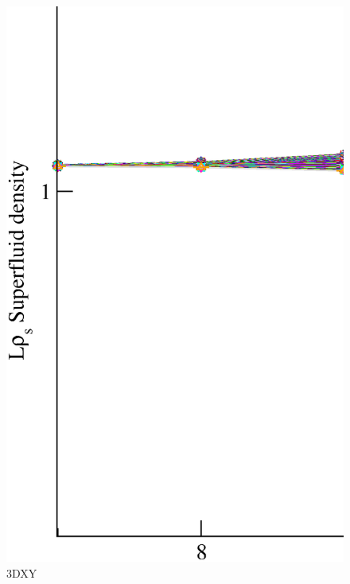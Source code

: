 \begin{figure}[!htpb]
  \centering
  \includegraphics[width=15cm]{./plots/3DXY/3DXY_SuperfluidDensity_vs_L.eps}
  \caption{3DXY}
\end{figure}

